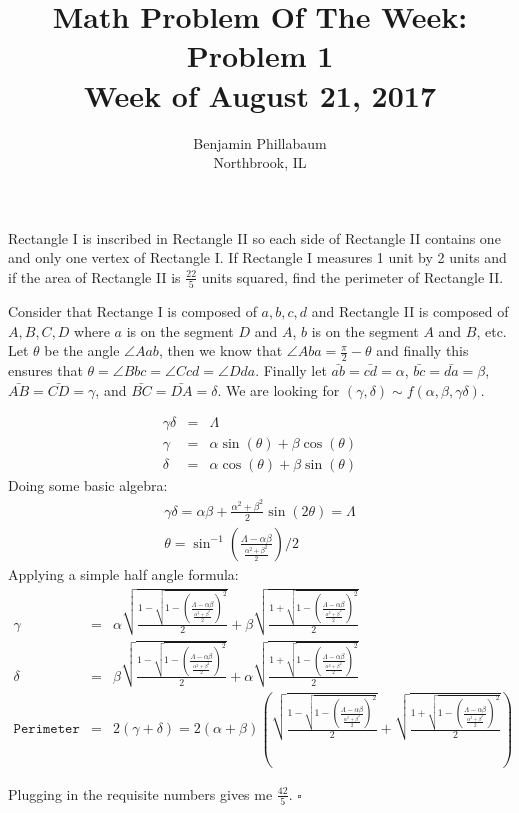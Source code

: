 \documentclass[11pt]{article}
\title{Math Problem Of The Week: Problem 1\\Week of August 21, 2017}
\author{Benjamin Phillabaum\\Northbrook, IL}
\begin{document}
\maketitle
\newpage

\begin{framed}
Rectangle I is inscribed in  Rectangle II so each side of Rectangle II contains one and only one vertex of Rectangle I. If Rectangle I measures 1 unit by 2 units and if the area of Rectangle II is $\frac{22}{5}$ units squared, find the perimeter of Rectangle II.
\end{framed}

Consider that Rectange I is composed of $a,b,c,d$ and Rectangle II is composed of $A,B,C,D$ where $a$ is on the segment $D$ and $A$, $b$ is on the segment $A$ and $B$, etc. Let $\theta$ be the angle $\angle Aab$, then we know that $\angle Aba = \frac{\pi}{2} - \theta$ and finally this ensures that $\theta = \angle Bbc = \angle Ccd = \angle Dda$. Finally let $\bar{ab} = \bar{cd} = \alpha$, $\bar{bc} = \bar{da} = \beta$, $\bar{AB} = \bar{CD} = \gamma$, and $\bar{BC} = \bar{DA} = \delta$. We are looking for $(\gamma,\delta) \sim f(\alpha,\beta,\gamma \delta)$.

\begin{eqnarray*}
\gamma \delta &=& \Lambda \\
\gamma &=& \alpha \sin(\theta) + \beta \cos(\theta) \\
\delta &=& \alpha \cos(\theta) + \beta \sin(\theta) 
\end{eqnarray*}
Doing some basic algebra:
\begin{eqnarray*}
\gamma \delta = \alpha \beta + \frac{\alpha^2+\beta^2}{2} \sin(2\theta) = \Lambda\\
\theta = \sin^{-1} (\frac{\Lambda - \alpha \beta}{\frac{\alpha^2+\beta^2}{2}})/2
\end{eqnarray*}
Applying a simple half angle formula:
\begin{eqnarray*}
\gamma &=& \alpha \sqrt{\frac{1-\sqrt{1- (\frac{\Lambda - \alpha \beta}{\frac{\alpha^2+\beta^2}{2}})^2}}{2}}+\beta \sqrt{\frac{1+\sqrt{1- (\frac{\Lambda - \alpha \beta}{\frac{\alpha^2+\beta^2}{2}})^2}}{2}}\\
\delta &=&\beta \sqrt{\frac{1-\sqrt{1- (\frac{\Lambda - \alpha \beta}{\frac{\alpha^2+\beta^2}{2}})^2}}{2}}+\alpha \sqrt{\frac{1+\sqrt{1- (\frac{\Lambda - \alpha \beta}{\frac{\alpha^2+\beta^2}{2}})^2}}{2}}\\
\texttt{Perimeter} &=& 2(\gamma+\delta) = 2(\alpha+\beta)\left( \sqrt{\frac{1-\sqrt{1- (\frac{\Lambda - \alpha \beta}{\frac{\alpha^2+\beta^2}{2}})^2}}{2}}+ \sqrt{\frac{1+\sqrt{1- (\frac{\Lambda - \alpha \beta}{\frac{\alpha^2+\beta^2}{2}})^2}}{2}}\right)
\end{eqnarray*}

Plugging in the requisite numbers gives me $\frac{42}{5}$.
$\square$
\end{document}
